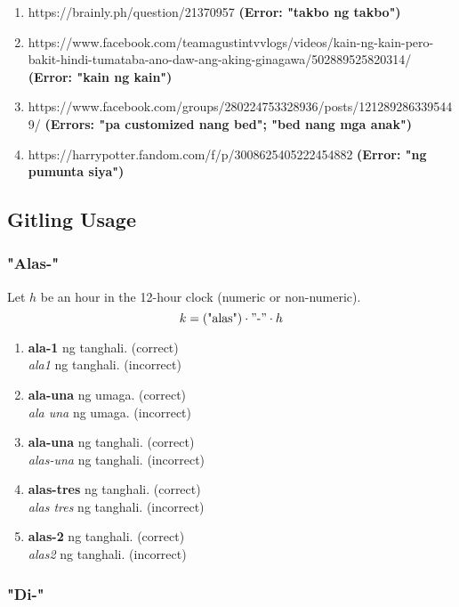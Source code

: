 \begin{enumerate}
      \item https://brainly.ph/question/21370957 \textbf{(Error: "takbo ng takbo")}
      \item https://www.facebook.com/teamagustintvvlogs/videos/kain-ng-kain-pero-bakit-hindi-tumataba-ano-daw-ang-aking-ginagawa/502889525820314/ \textbf{(Error: "kain ng kain")}
      \item https://www.facebook.com/groups/280224753328936/posts/1212892863395449/ \textbf{(Errors: "pa customized nang bed"; "bed nang mga anak")}
      \item https://harrypotter.fandom.com/f/p/3008625405222454882 \textbf{(Error: "ng pumunta siya")}
\end{enumerate}

\subsection{Gitling Usage}

\subsubsection{"Alas-"}
Let \(h\) be an hour in the 12-hour clock (numeric or non-numeric).
\[
      k = (\text{"alas"}) \cdot "\text{-}" \cdot h
\]
\begin{example}
\end{example}
\begin{enumerate}
      \item \textbf{ala-1} ng tanghali. (correct) \\
            \textit{ala1} ng tanghali. (incorrect)
      \item \textbf{ala-una} ng umaga. (correct) \\
            \textit{ala una} ng umaga. (incorrect)
      \item \textbf{ala-una} ng tanghali. (correct) \\
            \textit{alas-una} ng tanghali. (incorrect)
      \item \textbf{alas-tres} ng tanghali. (correct) \\
            \textit{alas tres} ng tanghali. (incorrect)
      \item \textbf{alas-2} ng tanghali. (correct) \\
            \textit{alas2} ng tanghali. (incorrect)
\end{enumerate}

\subsubsection{"Di-"}

